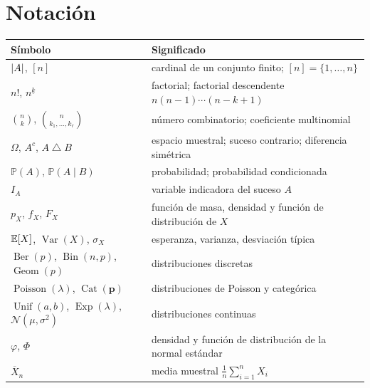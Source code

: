 \documentclass[11pt,a4paper,twoside,openany]{book}
\newcommand{\PP}{\mathbb{P}}
\newcommand{\Nor}{\mathcal{N}}
\newcommand{\Xbar}{\overline{X}}
\newcommand{\dsim}{\mathbin{\triangle}}
\DeclareMathOperator{\Var}{Var}
\DeclareMathOperator{\Ber}{Ber}
\DeclareMathOperator{\Bin}{Bin}
\DeclareMathOperator{\Geom}{Geom}
\DeclareMathOperator{\Poi}{Poisson}
\DeclareMathOperator{\Cat}{Cat}
\DeclareMathOperator{\Unif}{Unif}
\DeclareMathOperator{\Expo}{Exp}
\begin{document}
\section*{Notación}
\begin{center}
\begin{tabular}{@{}ll@{}}
\toprule
Símbolo & Significado \\
\midrule
$\lvert A\rvert$, $[n]$ & cardinal de un conjunto finito; $[n]=\{1,\dots,n\}$ \\
$n!$, $n^{\underline{k}}$ & factorial; factorial descendente $n(n-1)\cdots(n-k+1)$ \\
$\binom nk$, $\binom{n}{k_1,\dots,k_r}$ & número combinatorio; coeficiente multinomial \\
$\Omega$, $A^{c}$, $A\dsim B$ & espacio muestral; suceso contrario; diferencia simétrica \\
$\PP(A)$, $\PP(A\mid B)$ & probabilidad; probabilidad condicionada \\
$I_A$ & variable indicadora del suceso $A$ \\
$p_X$, $f_X$, $F_X$ & función de masa, densidad y función de distribución de $X$ \\
$\mathbb{E}[X]$, $\Var(X)$, $\sigma_X$ & esperanza, varianza, desviación típica \\
$\Ber(p)$, $\Bin(n,p)$, $\Geom(p)$ & distribuciones discretas \\
$\Poi(\lambda)$, $\Cat(\bm p)$ & distribuciones de Poisson y categórica \\
$\Unif(a,b)$, $\Expo(\lambda)$, $\Nor(\mu,\sigma^{2})$ & distribuciones continuas \\
$\varphi$, $\Phi$ & densidad y función de distribución de la normal estándar \\
$\Xbar_n$ & media muestral $\frac1n\sum_{i=1}^{n}X_i$ \\
\bottomrule
\end{tabular}
\end{center}


\tableofcontents

\mainmatter







\backmatter

\end{document}
